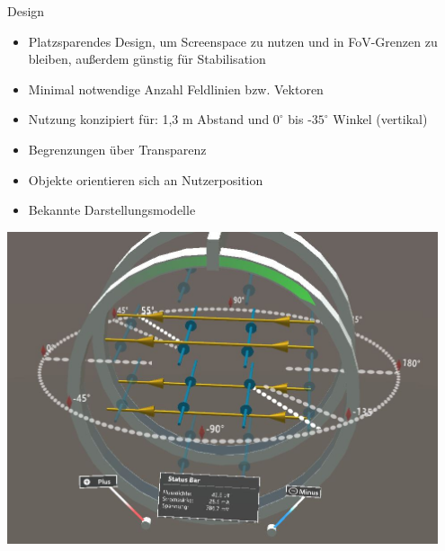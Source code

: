 \begin{frame}[fragile]{Design}
\vspace{-10px}
\begin{minipage}[t]{\textwidth}
	{
		\begin{itemize}[itemsep=1mm]
			\item Platzsparendes Design, um Screenspace zu nutzen und in FoV-Grenzen zu bleiben, außerdem günstig für Stabilisation
			\item Minimal notwendige Anzahl Feldlinien bzw. Vektoren
			\item Nutzung konzipiert für: 1,3 m Abstand und $0^\circ$ bis -$35^\circ$ Winkel (vertikal)
		\end{itemize}
	}
\end{minipage}


\begin{minipage}{0.6\textwidth}
	{
	\begin{itemize}[itemsep=1mm]
		\item Begrenzungen über Transparenz
		\item Objekte orientieren sich an Nutzerposition
		\item Bekannte Darstellungsmodelle
	\end{itemize}
	}
\end{minipage}
\begin{minipage}{0.35\textwidth}
	\centering
	\includegraphics[width=0.95\textwidth]{images/unity/overview.jpg}\\
\end{minipage}
\end{frame}

